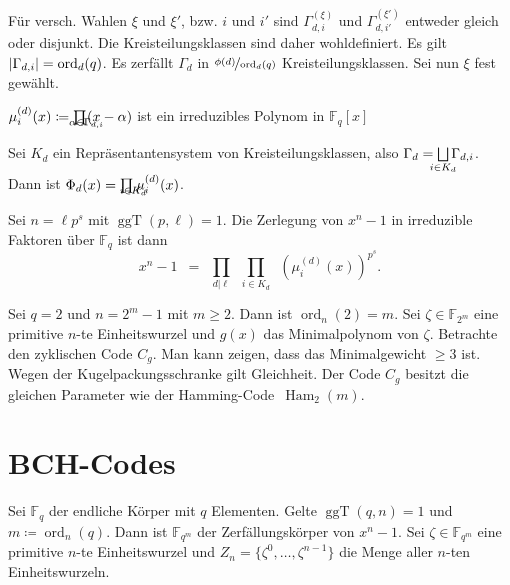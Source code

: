 \documentclass{cheat-sheet}
\newcommand{\F}{\mathbb{F}} %
\newcommand{\divides}{|} %
\DeclareMathOperator{\Ham}{Ham} %
\DeclareMathOperator{\ggT}{ggT} %
\DeclareMathOperator{\ord}{ord} %
\begin{document}
\begin{bem}
  Für versch. Wahlen $\xi$ und $\xi'$, bzw. $i$ und $i'$ sind $\Gamma^{(\xi)}_{d,i}$ und $\Gamma^{(\xi')}_{d,i'}$ entweder gleich oder disjunkt.
  Die Kreisteilungsklassen sind daher wohldefiniert.
  Es gilt $\abs{\Gamma_{d,i}} = \ord_d(q)$.
  Es zerfällt $\Gamma_d$ in $\nicefrac{\phi(d)}{\ord_d(q)}$ Kreisteilungsklassen.
  Sei nun $\xi$ fest gewählt.
\end{bem}

\begin{lem}
  $\mu^{(d)}_i(x) \coloneqq \prod_{\mathclap{\alpha \in \Gamma_{d,i}}} (x - \alpha)$ ist ein irreduzibles Polynom in $\F_q [x]$
\end{lem}

\begin{kor}
  Sei $K_d$ ein Repräsentantensystem von Kreisteilungsklassen, also
  $\Gamma_d = \bigsqcup_{\mathclap{i \in K_d}} \Gamma_{d,i}$.
  Dann ist $\Phi_d(x) = \prod_{\mathclap{i \in K_d}} \mu^{(d)}_i(x)$.
\end{kor}

\begin{fazit}
  Sei $n = \ell p^s$ mit $\ggT(p, \ell) = 1$.
  Die Zerlegung von $x^n - 1$ in irreduzible Faktoren über $\F_q$ ist dann
  \[
    x^n - 1 \enspace = \enspace \prod_{d \divides \ell} \enspace \prod_{i \in K_d} \enspace \left( \mu^{(d)}_i(x) \right)^{p^s}.
  \]
\end{fazit}



\begin{bsp}
  Sei $q = 2$ und $n = 2^m - 1$ mit $m \geq 2$.
  Dann ist $\ord_n(2) = m$.
  Sei $\zeta \in \F_{2^m}$ eine primitive $n$-te Einheitswurzel und $g(x)$ das Minimalpolynom von $\zeta$.
  Betrachte den zyklischen Code $C_g$.
  Man kann zeigen, dass das Minimalgewicht $\geq 3$ ist.
  Wegen der Kugelpackungsschranke gilt Gleichheit.
  Der Code $C_g$ besitzt die gleichen Parameter wie der Hamming-Code~$\Ham_2(m)$.
\end{bsp}


\section{BCH-Codes}


\begin{situation}
  Sei $\F_q$ der endliche Körper mit $q$ Elementen.
  Gelte $\ggT(q, n) = 1$ und $m \coloneqq \ord_n(q)$.
  Dann ist $\F_{q^m}$ der Zerfällungskörper von $x^n - 1$.
  Sei $\zeta \in \F_{q^m}$ eine primitive $n$-te Einheitswurzel und $Z_n = \{ \zeta^0, \ldots, \zeta^{n-1} \}$ die Menge aller $n$-ten Einheitswurzeln.
\end{situation}
\end{document}
